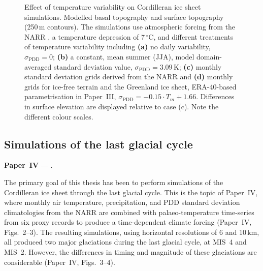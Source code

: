 \documentclass{article}
\newcommand{\sPDD}[0]{\sigma_{\mathrm{PDD}}}
\newcommand{\unit}[1]{\ensuremath{\mathrm{#1}}}
\newcommand{\degree}[0]{\ensuremath{^{\circ}}}
\newcommand{\degC}[0]{\unit{{\degree}C}}
\newcommand{\PSDP}[0]{Paper~III}    %
\newcommand{\CCYC}[0]{Paper~IV}     %
\begin{document}
\begin{figure}
  \centering
  \caption{Effect of temperature variability on Cordilleran ice sheet
           simulations. Modelled basal topography and surface topography
           (250\,m contours). The simulations use atmospheric forcing from the
           NARR \citep{Mesinger.etal.2006}, a temperature depression of
           7\,\degC, and different treatments of temperature variability
           including
           \textbf{(a)} no daily variability, $\sPDD=0$;
           \textbf{(b)} a constant, mean summer (JJA), model domain-averaged
           standard deviation value, $\sPDD=3.09$\,K;
           \textbf{(c)} monthly standard deviation grids derived from the NARR
           and
           \textbf{(d)} monthly grids for ice-free terrain and the
           Greenland ice sheet, ERA-40-based \citep{Uppala.etal.2005}
           parametrisation in \PSDP, ${\sPDD=-0.15\cdot{T_m}+1.66}$.
           Differences in surface elevation are displayed relative to case (c).
           Note the different colour scales.}
  \label{fig:plot-sdeffect}
\end{figure}


\subsection{Simulations of the last glacial cycle}

\noindent\textbf{\CCYC} --- .
\bigskip

The primary goal of this thesis has been to perform simulations of the
Cordilleran ice sheet through the last glacial cycle. This is the topic of
\CCYC, where monthly air temperature, precipitation, and PDD standard deviation
climatologies from the NARR are combined with palaeo-temperature time-series
from six proxy records to produce a time-dependent climate forcing (\CCYC,
Figs.~2--3). The resulting simulations, using horizontal resolutions of 6 and
10\,km, all produced two major glaciations during the last glacial cycle, at
MIS~4 and MIS~2. However, the differences in timing and magnitude of these
glaciations are considerable (\CCYC, Figs.~3--4).
\end{document}
